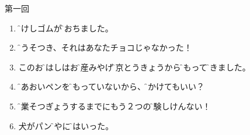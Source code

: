 \documentclass[intermediate]{grampig}
\begin{document}
	{\Large {} \hfill 第一回} \vspace{1em}
	
	\begin{enumerate}
		\item \parbox[t]{\linewidth}{\f{消}{け}しゴムが\e\ansline{}\f{落}{お}ちました。\hfill {}}
		\bh\strut
		
		\item \f{嘘}{うそ}つき、それはあなた\e\ansline{}チョコじゃなかった！\hfill {}
		\bh\strut
		
		\item このお\f{箸}{はし}はお\f{土産}{みやげ}\e\ansline{}\f{東京}{とうきょう}から\f{持}{も}って\f{来}{き}ました。\hfill {}
		\bh\strut
		
		\item \f{青}{あお}いペンを\f{持}{も}っていないから、\e\ansline{}\f{書}{か}けてもいい？ \hfill {}
		\bh\strut
		
		\item \f{卒業}{そつぎょう}するまでにもう２つの\f{試験}{しけん}\e\ansline{}ない！ \hfill {} 
		\bh\strut
		
		\item \e\ansline{}犬がパン\f{屋}{や}に\f{入}{はい}った。\hfill {}
		\bh\strut
	\end{enumerate}
\end{document}
